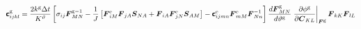 \documentclass[10pt,letterpaper,oneside]{report}
\newcommand{\ten}[1]{\mbox{\boldmath $#1$}{}}
\newcommand{\tenf}[1]{\mbox{{\sffamily{\bfseries {#1}}}}}
\newcommand{\scas}[1]{\mbox{{\scriptsize{${\rm{#1}}$}}}{}}
\newcommand{\tens}[1]{\mbox{\boldmath{\scriptsize{$#1$}}}{}}
\begin{document}
\begin{align}
\tenf{c}^{\scas{g}}_{ijkl} 
={}& \frac{2 k^{\scas{g}} \Delta t}{K^\vartheta} \left[ \sigma_{ij} \ten{F}^{\scas{g}-1}_{MN} 
- \frac{1}{J} \left[ \ten{F}^{\scas{e}}_{iM} \ten{F}_{jA} \ten{S}_{NA} + \ten{F}_{iA} \ten{F}^{\scas{e}}_{jN} \ten{S}_{AM} \right]
- \tenf{c}^{\scas{e}}_{ijmn} \ten{F}^{\scas{e}}_{mM} \ten{F}^{-1}_{Nn} \right] 
\frac{d \ten{F}^{\scas{g}}_{MN}}{d \vartheta^{\scas{g}}} \left. \frac{\partial \phi^{\scas{g}} }{\partial \ten{C}_{KL}} \right|_{\tens{F}^{\scas{g}}} \ten{F}_{kK} \ten{F}_{lL} 
\notag \\

\end{align}
\end{document}
